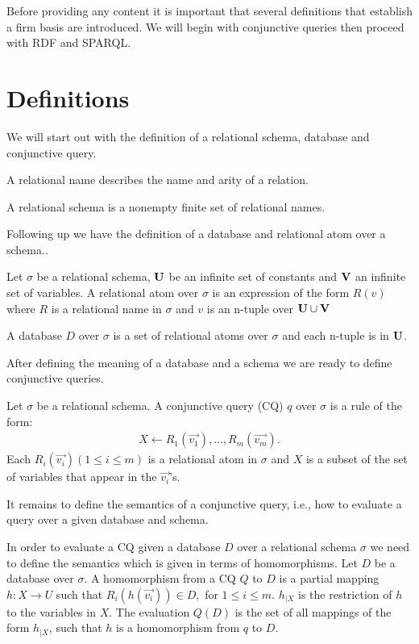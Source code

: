 Before providing any content it is important that several definitions that
establish a firm basis are introduced. We will begin with conjunctive
queries then proceed with RDF and SPARQL.

\section{Definitions}

We will start out with the definition of a 
relational schema, database and conjunctive query. 

A relational name describes the name and arity of a relation.
\begin{definition}
	A relational schema is a nonempty finite set of relational names.
\end{definition}
Following up we have the definition of a database and relational atom over a
schema..

\begin{definition}
	Let $\sigma$ be a relational schema, 
	$\mathbf{U}$ be an infinite set of constants and $\mathbf{V}$ an infinite set of variables.
	A relational atom over $\sigma$ is an expression of the form $R(v)$ where $R$
	is a relational name in $\sigma$ and $v$ is an n-tuple over $\mathbf{U} \cup \mathbf{V}$

	A database $D$ over $\sigma$ is a set of relational atoms over $\sigma$ and
	each n-tuple is in $\mathbf{U}$.
\end{definition}

After defining the meaning of a database and a schema we are ready to define
conjunctive queries.

\begin{definition}
	Let $\sigma$ be a relational schema.
	A conjunctive query (CQ) $q$ over $\sigma$ is a rule of the form:
	\begin{align*}
		X \leftarrow R_1(\vec{v_1}), \dots, R_m(\vec{v_m}).
	\end{align*}
	Each $R_i(\vec{v_i}) (1\leq i \leq m)$ is a relational atom in $\sigma$ and 
	$X$ is a subset of the set of variables that appear in the
	$\vec{v_i}$'s.
\end{definition}

It remains to define the semantics of a conjunctive query, i.e., how to evaluate
a query over a given database and schema.
\begin{definition}
	In order to evaluate a CQ given a database $D$ over a relational schema $\sigma$
	we need to define the semantics which is given in terms of homomorphisms.
	Let $D$ be a database over $\sigma$.  A homomorphism from a CQ $Q$ to $D$ is a
	partial mapping $h: X \rightarrow U$ such that $R_i(h(\vec{v_i})) \in D,$ for 
	$1 \leq i \leq m$. $h_{|X}$ is the restriction of $h$ to the variables in
	$X$. The evaluation $Q(D)$ is the set of all mappings of the form
	$h_{|X}$, such that $h$ is a homomorphism from $q$ to $D$.
\end{definition}

